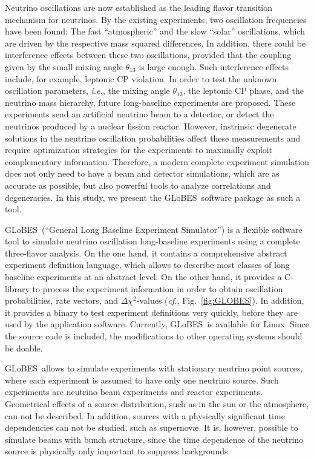 \documentclass[12pt,a4paper]{article}
\newcommand{\ie}{{\it i.e.}}
\newcommand{\cf}{{\it cf.}}
\newcommand{\fig}{Fig.}
\newcommand{\GLOBES}{{\sf GLoBES}}
\newcommand{\figu}[1]{\fig~\ref{fig:#1}}
\begin{document}
Neutrino oscillations are now established as the leading flavor
transition mechanism for neutrinos. By the existing experiments, 
two oscillation
frequencies have been found: The fast ``atmospheric'' and the
slow ``solar'' oscillations, which are driven by the respective
mass squared differences.  In addition, there could be interference
effects between these two oscillations, provided that the coupling given by the small mixing angle $\theta_{13}$ is large enough. Such interference
effects include, for example, leptonic CP violation.  In order to
test the unknown oscillation parameters, \ie, the mixing angle $\theta_{13}$, the leptonic CP phase, and the
neutrino mass hierarchy, future long-baseline experiments are proposed.
These experiments send an artificial neutrino beam to a detector, or
detect the neutrinos produced by a nuclear fission reactor. However,
instrinsic degenerate solutions in the neutrino oscillation
probabilities affect these measurements and require optimization
strategies for the experiments to maximally exploit complementary
information. Therefore, a modern complete experiment simulation
does not only need to have a beam and detector simulations, which are
as accurate as possible, but also powerful tools to analyze correlations
and degeneracies. In this study, we present the \GLOBES\ software package
as such a tool.

\GLOBES\ (``General Long Baseline Experiment Simulator'') is a flexible
software tool to simulate neutrino oscillation long-baseline experiments using a complete three-flavor analysis. On the
one hand, it contains a comprehensive abstract experiment definition
language, which allows to describe most classes of long baseline experiments
at an abstract level. On the other hand, it provides a C-library to 
process the experiment information in order to obtain oscillation
probabilities, rate vectors, and $\Delta \chi^2$-values (\cf, \figu{GLOBES}). In addition, it provides a binary to test experiment
definitions very quickly, before they are used by the application software.
Currently, \GLOBES\ is available for Linux. Since the source code is included, the modifications to other operating systems should be doable.

\GLOBES\ allows to simulate experiments with stationary neutrino point sources, where each experiment is assumed to have only one neutrino source.
Such experiments are neutrino beam experiments and reactor experiments. 
Geometrical effects of a source distribution, such as in the sun or the 
atmosphere, can not be described. In addition, sources with a physically 
significant time dependencies  can not be studied, such as  supernov\ae. It 
is, however, possible to simulate beams with bunch structure, since the 
time dependence of the neutrino source is physically only important to suppress backgrounds. 
\end{document}
